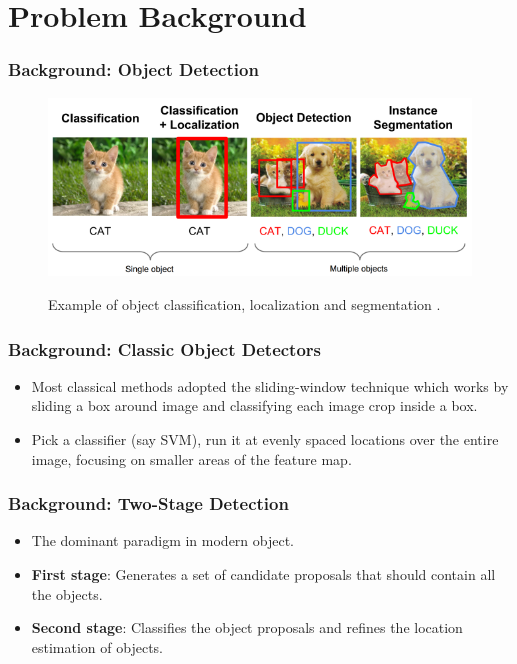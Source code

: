 \documentclass[10pt,fleqn,unknownkeysallowed]{beamer}
\begin{document}
\section{Problem Background}
\begin{frame}
	\frametitle{Background: Object Detection}
	\begin{figure}
		\begin{center}
			\includegraphics[width=1.0\textwidth]{images/LocalizationDetectionCuteness}\\
			\caption{Example of object classification, localization and segmentation \cite{object_det_cat}.}
		\end{center}
	\end{figure}
\end{frame}

\begin{frame}
	\frametitle{Background: Classic Object Detectors}
	\begin{itemize}
		\item{Most classical methods adopted the sliding-window technique which works by sliding a box around image and classifying each image
			crop inside a box.}
		\item{Pick a classifier (say SVM), run it at evenly spaced locations over the
			entire image, focusing on smaller areas of the feature map.}
	\end{itemize}
\end{frame}

\begin{frame}
	\frametitle{Background: Two-Stage Detection}
	\linespread{1.5}
	\begin{itemize}
		\item{The dominant paradigm in modern object.}
		\item{\textbf{First stage}: Generates
			a set of candidate proposals that should contain all the objects.}
		\item{\textbf{Second stage}: Classifies the object proposals and refines the location estimation of objects.}
	\end{itemize}
\end{frame}
\end{document}
